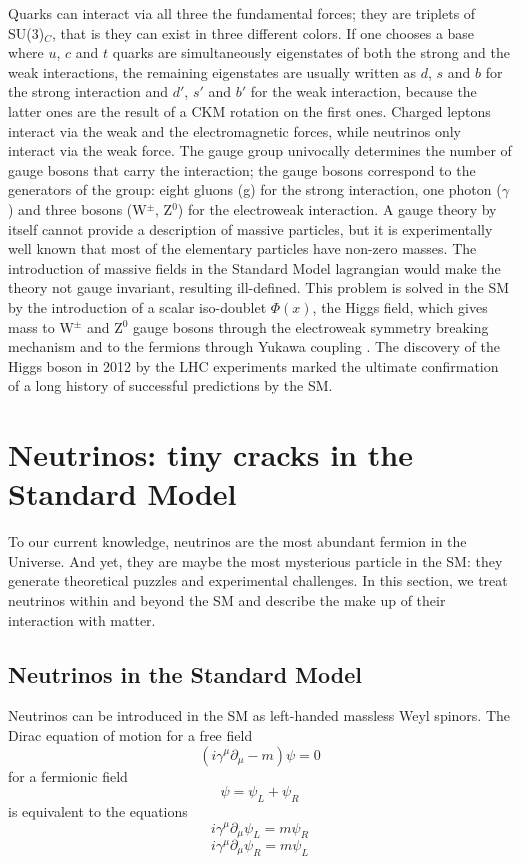 Quarks can interact via all three the fundamental forces; they are triplets of SU(3)$_C$, that is they can exist in three different colors. If one chooses a base where $u$, $c$ and $t$ quarks are simultaneously eigenstates of both the strong and the weak interactions, the remaining eigenstates are usually written as $d$, $s$ and $b$ for the strong interaction and $d'$, $s'$ and $b'$ for the weak interaction, because the latter ones are the result of a CKM rotation on the first ones.
Charged leptons interact via the weak and the electromagnetic forces, while neutrinos only interact via the weak force. 
The gauge group univocally determines the number of gauge bosons that carry the interaction; the gauge bosons correspond to the generators of the group: eight gluons (g) for the strong interaction, one photon ($\gamma$) and three bosons (W$^\pm$, Z$^0$) for the electroweak interaction.
A gauge theory by itself cannot provide a description of massive particles, but it is experimentally well known that most of the elementary particles have non-zero masses. The introduction of massive fields in the Standard Model lagrangian would make the theory not gauge invariant, resulting ill-defined. This problem is solved in the SM by the introduction of a scalar iso-doublet $\Phi(x)$, the Higgs field, which gives mass to W$^\pm$ and Z$^0$ gauge bosons through the electroweak symmetry breaking mechanism and to the fermions through Yukawa coupling \cite{Higgs1964}.  The discovery of the Higgs boson in 2012 by the LHC experiments \cite{201230,Aad2012} marked the ultimate confirmation  of a long history of successful predictions by the SM.

\section{Neutrinos:  tiny cracks in the Standard Model}\label{ch:nus}
To our current knowledge, neutrinos are the most abundant fermion in the Universe. And yet, they are maybe the most mysterious particle in the SM: they generate theoretical puzzles and experimental challenges. In this section, we treat neutrinos within and beyond the SM and describe the make up of their interaction with matter.

\subsection{Neutrinos in the Standard Model}
Neutrinos can be introduced in the SM as left-handed massless Weyl spinors.
The Dirac equation of motion for a free field
\begin{equation}
(i\gamma^ \mu \partial_\mu - m) \psi = 0
\end{equation}
for a fermionic field 
\begin{equation}
 \psi =  \psi_L +  \psi_R
\end{equation}
is equivalent to the equations
\begin{equation}
i\gamma^ \mu \partial_\mu  \psi_L = m \psi_R
\label{eq:15}
\end{equation}
\begin{equation}
i\gamma^ \mu \partial_\mu  \psi_R = m \psi_L
\label{eq:16}
\end{equation}

